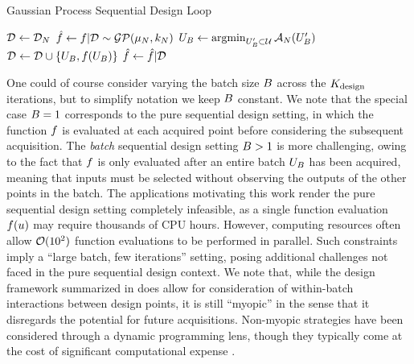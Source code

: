 \documentclass[12pt]{article}
\begin{document}
\begin{algorithm}
    \caption{Gaussian Process Sequential Design Loop}
    \label{alg:seq_des_loop}
    \begin{algorithmic}[1] %
    	\State $\design[] \gets \design[\Ndesign]$ 
	\State $\hat{f} \gets f|\design[] \sim \GP(\gpMean[\Ndesign], \gpKer[\Ndesign])$
         
        		\State $\designBatchIn \gets \argmin_{\designBatchIn^\prime \subset \parSpace} \acq[\Ndesign](\designBatchIn^\prime)$ 
		\State $\design[] \gets \design[] \cup \{\designBatchIn, \func(\designBatchIn)\}$
		\State $\hat{f} \gets \hat{f} | \design[]$
	\EndFor
	\EndFunction
    \end{algorithmic}
\end{algorithm}

One could of course consider 
varying the batch size $\Nbatch$ across the $\Nrounds$ iterations, but to simplify notation we keep $\Nbatch$ constant. We note that the 
special case $\Nbatch = 1$ corresponds to the pure sequential design setting, in which the function $\func$ is evaluated at each acquired 
point before considering the subsequent acquisition. The \textit{batch} sequential design setting $\Nbatch > 1$ is more challenging,  
owing to the fact that $\func$ is only evaluated after an entire batch $\designBatchIn$ has been acquired, meaning that inputs must 
be selected without observing the outputs of the other points in the batch. The applications motivating this work render the 
pure sequential design setting completely infeasible, as a single function evaluation $f(\Par)$ may require thousands of CPU hours. 
However, computing resources often allow $\BigO(10^2)$ function evaluations to be performed in parallel. Such constraints imply a 
``large batch, few iterations'' setting, posing additional challenges not faced in the pure sequential design context. We note that, 
while the design framework summarized in  does allow for consideration of within-batch interactions between design points, 
it is still ``myopic'' in the sense that it disregards the potential for future acquisitions. Non-myopic strategies have been considered
through a dynamic programming lens, though they typically come at the cost of significant 
computational expense \cite{SURThesis, supermartingaleSUR}.
\end{document}
